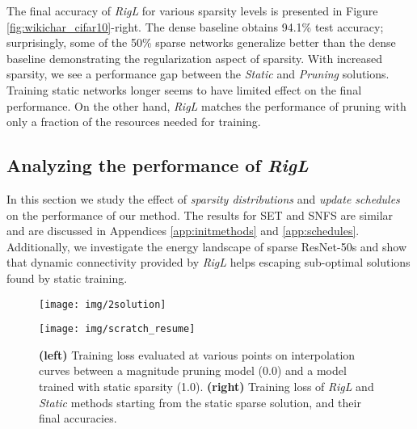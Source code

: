 \documentclass{article}
\begin{document}
The final accuracy of {\em RigL} for various sparsity levels is presented in Figure \ref{fig:wikichar_cifar10}-right. The dense baseline obtains 94.1\% test accuracy; surprisingly, some of the 50\% sparse networks generalize better than the dense baseline demonstrating the regularization aspect of sparsity. With increased sparsity, we see a performance gap between the \textit{Static} and \textit{Pruning} solutions. Training static networks longer seems to have limited effect on the final performance. On the other hand, {\em RigL} matches the performance of pruning with only a fraction of the resources needed for training.
\subsection{Analyzing the performance of {\em RigL}}
\label{sec:experiments_ablation}

In this section we study the effect of \textit{sparsity distributions} and \textit{update schedules} on the performance of our method. The results for SET and SNFS are similar and are discussed in Appendices \ref{app:initmethods} and \ref{app:schedules}. Additionally, we investigate the energy landscape of sparse ResNet-50s and show that dynamic connectivity provided by {\em RigL} helps escaping sub-optimal solutions found by static training.

\begin{figure*}
\centering
\begin{minipage}{.4\textwidth}
  \centering
  \texttt{[image: img/2solution]}
\end{minipage}\begin{minipage}{.6\textwidth}
  \centering
  \texttt{[image: img/scratch\_resume]}
\end{minipage}
\caption{\textbf{(left)} Training loss evaluated at various points on interpolation curves between a magnitude pruning model (0.0) and a model trained with static sparsity (1.0). \textbf{(right)} Training loss of {\em RigL} and {\em Static} methods starting from the static sparse solution, and their final accuracies.}
\label{fig:discussion}
\end{figure*}
\end{document}
